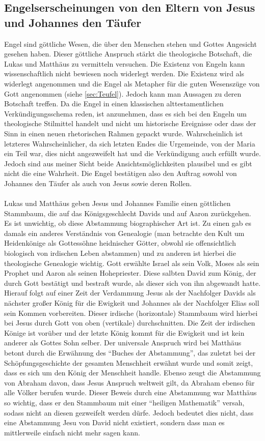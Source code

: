 \subsection{Engelserscheinungen von den Eltern von Jesus und Johannes den Täufer}
Engel sind göttliche Wesen, die über den Menschen stehen und Gottes Angesicht gesehen haben. Dieser göttliche Anspruch stärkt die theologische Botschaft, die Lukas und Matthäus zu vermitteln versuchen. Die Existenz von Engeln kann wissenschaftlich nicht bewiesen noch widerlegt werden. Die Existenz wird als widerlegt angenommen und die Engel als Metapher für die guten Wesenszüge von Gott angenommen (siehe \ref{sec:Teufel}). Jedoch kann man Aussagen zu deren Botschaft treffen. Da die Engel in einen klassischen alttestamentlichen Verkündigungsschema reden, ist anzunehmen, dass es sich bei den Engeln um theologische Stilmittel handelt und nicht um historische Ereignisse oder dass der Sinn in einen neuen rhetorischen Rahmen gepackt wurde. Wahrscheinlich ist letzteres Wahrscheinlicher, da sich letzten Endes die Urgemeinde, von der Maria ein Teil war, dies nicht angezweifelt hat und die Verkündigung auch erfüllt wurde. Jedoch sind aus meiner Sicht beide Ansichtsmöglichkeiten plausibel und es gibt nicht die eine Wahrheit. Die Engel bestätigen also den Auftrag sowohl von Johannes den Täufer als auch von Jesus sowie deren Rollen.
\\~\\
Lukas und Matthäus geben Jesus und Johannes Familie einen göttlichen Stammbaum, die  auf das Königsgeschlecht Davids und auf Aaron zurückgehen. Es ist unwichtig, ob diese Abstammung biographischer Art ist. Zu einen gab es damals ein anderes Verständnis von Genealogie (man betrachte den Kult um Heidenkönige als Gottessöhne heidnischer Götter, obwohl sie offensichtlich biologisch von irdischen Leben abstammen) und zu anderen ist hierbei die theologische Genealogie wichtig. Gott erwählte Israel als sein Volk, Moses als sein Prophet und Aaron als seinen Hohepriester. Diese salbten David zum König, der durch Gott bestätigt und bestraft wurde, als dieser sich von ihn abgewandt hatte. Hierauf folgt auf einer Zeit der Verdammung Jesus als der Nachfolger Davids als nächster großer König für die Ewigkeit und Johannes als der Nachfolger Elias soll sein Kommen vorbereiten. Dieser irdische (horizontale) Stammbaum wird hierbei bei Jesus durch Gott von oben (vertikale) durchschnitten. Die Zeit der irdischen Könige ist vorüber und der letzte König kommt für die Ewigkeit und ist kein anderer als Gottes Sohn selber. Der universale Anspruch wird bei Matthäus betont durch die Erwähnung des ``Buches der Abstammung'', das zuletzt bei der Schöpfungsgeschichte der gesamten Menschheit erwähnt wurde und somit zeigt, dass es sich um den König der Menschheit handle. Ebenso zeugt die Abstammung von Abraham davon, dass Jesus Anspruch weltweit gilt, da Abraham ebenso für alle Völker berufen wurde. Dieser Beweis durch eine Abstammung war Matthäus so wichtig, dass er den Stammbaum mit einer ``heiligen Mathematik'' versah, sodass nicht an diesen gezweifelt werden dürfe. Jedoch bedeutet dies nicht, dass eine Abstammung Jesu von David nicht existiert, sondern dass man es mittlerweile einfach nicht mehr sagen kann.
